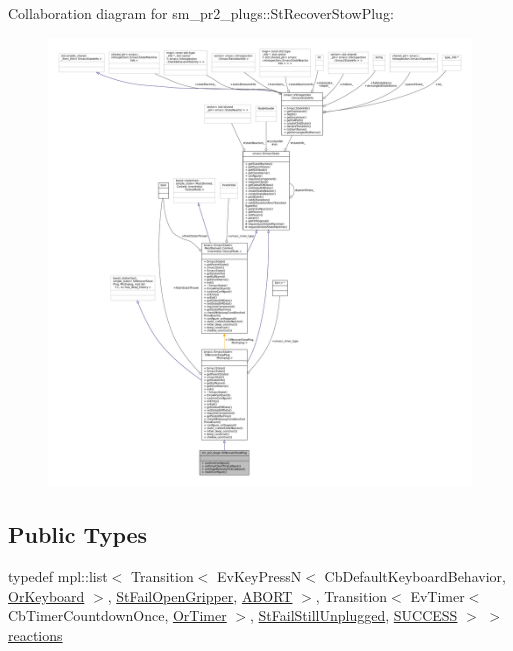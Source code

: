 Collaboration diagram for sm\+\_\+pr2\+\_\+plugs\+:\+:St\+Recover\+Stow\+Plug\+:
\nopagebreak
\begin{figure}[H]
\begin{center}
\leavevmode
\includegraphics[width=350pt]{structsm__pr2__plugs_1_1StRecoverStowPlug__coll__graph}
\end{center}
\end{figure}
\subsection*{Public Types}
\begin{DoxyCompactItemize}
\item 
typedef mpl\+::list$<$ Transition$<$ Ev\+Key\+PressN$<$ Cb\+Default\+Keyboard\+Behavior, \hyperlink{classsm__pr2__plugs_1_1OrKeyboard}{Or\+Keyboard} $>$, \hyperlink{structsm__pr2__plugs_1_1StFailOpenGripper}{St\+Fail\+Open\+Gripper}, \hyperlink{classABORT}{A\+B\+O\+RT} $>$, Transition$<$ Ev\+Timer$<$ Cb\+Timer\+Countdown\+Once, \hyperlink{classsm__pr2__plugs_1_1OrTimer}{Or\+Timer} $>$, \hyperlink{structsm__pr2__plugs_1_1StFailStillUnplugged}{St\+Fail\+Still\+Unplugged}, \hyperlink{classSUCCESS}{S\+U\+C\+C\+E\+SS} $>$ $>$ \hyperlink{structsm__pr2__plugs_1_1StRecoverStowPlug_a44331b5028d908b5a20054cc2ddb1972}{reactions}
\end{DoxyCompactItemize}
